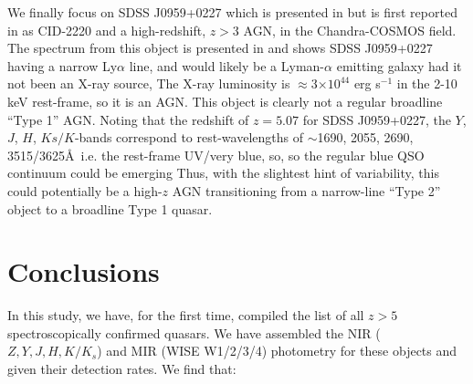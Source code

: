 \documentclass[usenatbib]{mnras}
\begin{document}
We finally focus on SDSS J0959+0227 which is presented in
\citet{WangF2016} but is first reported in \citet{Civano2011} as
CID-2220 and a high-redshift, $z>3$ AGN, in the Chandra-COSMOS
field. The spectrum from this object is presented in \citet{Ikeda2012}
and shows SDSS J0959+0227 having a narrow Ly$\alpha$ line, and would
likely be a Lyman-$\alpha$ emitting galaxy had it not been an X-ray
source, The X-ray luminosity is $\approx$3$\times10^{44}$ erg s$^{-1}$
in the 2-10 keV rest-frame, so it is an AGN. This object is clearly
not a regular broadline ``Type 1'' AGN. Noting that the redshift of
$z=5.07$ for SDSS J0959+0227, the $Y$, $J$, $H$, $Ks/K$-bands
correspond to rest-wavelengths of $\sim$1690, 2055, 2690,
3515/3625\AA\ i.e. the rest-frame UV/very blue, so, so the regular
blue QSO continuum could be emerging Thus, with the slightest hint of
variability, this could potentially be a high-$z$ AGN transitioning
from a narrow-line ``Type 2'' object to a broadline Type 1 quasar.



%



\section{Conclusions}\label{sec:conclusions}
In this study, we have, for the first time, compiled the list of all
$z>5$ spectroscopically confirmed quasars. We have assembled the NIR
($Z, Y, J, H, K/K_{s}$) and MIR (WISE W1/2/3/4) photometry for these
objects and given their detection rates. We find that: 
\end{document}
